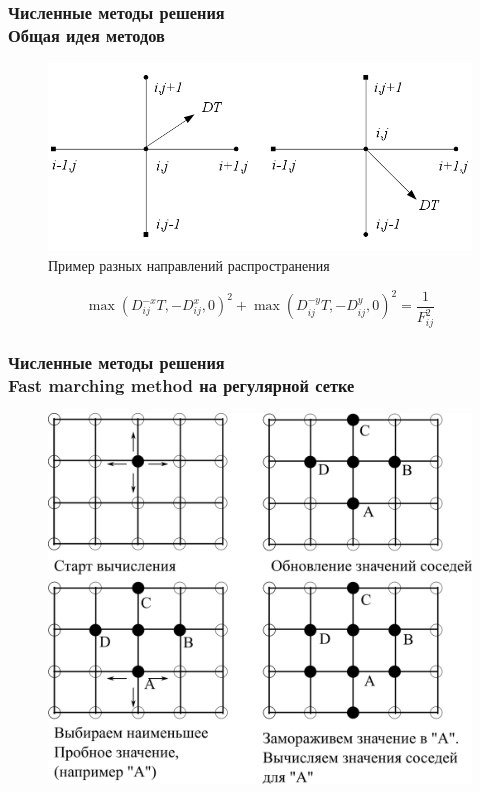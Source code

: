 \documentclass[hyperref={unicode=true},professionalfont]{beamer}
\newcommand{\stamp}{
	\begin{frame}[plain,noframenumbering]
		\begin{table}[h!]
			\flushright
			\vspace{5cm}
			\begin{adjustbox}{max width=0.7\textwidth}
				\begin{tabular}{
					|>{\footnotesize}p{0.8cm}|
					>{\footnotesize}p{0.8cm}|
					>{\footnotesize}p{2.2cm}|
					>{\footnotesize}p{1.1cm}|
					>{\footnotesize}p{0.8cm}|
					>{\footnotesize}p{5cm}|
					>{\footnotesize}p{0.1cm}|
					>{\footnotesize}p{0.1cm}|
					>{\footnotesize}p{0.1cm}|
					>{\footnotesize}p{0.8cm}|
					>{\footnotesize}p{1.4cm}|
				}
					\hline
					&&&&& \multicolumn{6}{>{\footnotesize}c|}{\multirow{3}{*}{\Large 0.043.00.00 ПЗ}} \\ \cline{1-5}
					&&&&& \multicolumn{6}{>{\footnotesize}c|}{} \\ \cline{1-5}
					Изм. & Лист & № Документа & Подпись & Дата & \multicolumn{6}{>{\footnotesize}c|}{} \\ \hline
					\multicolumn{2}{|>{\footnotesize}l|}{Разработал}
                    & Апанович Д.В. &  &  &
                                            \multirow{4}{5cm}{\centering
                                            Параллельный алгоритм
                                            численного решения
                                            анизотропного уравнения эйконала} & \multicolumn{3}{>{\footnotesize}l|}{Лит.} & Лист & Листов \\ \cline{1-5}\cline{7-11}
					\multicolumn{2}{|>{\footnotesize}l|}{Проверил}
                    & Казаков А.Л. &  &  &  & У & & & \insertframenumber & \inserttotalframenumber \\ \cline{1-5}\cline{7-11}
					\multicolumn{2}{|>{\footnotesize}l|}{Нормоконтролер}
                    & Казаков А.Л. &  &  &  & \multicolumn{5}{>{\footnotesize}l|}{} \\ \cline{1-5}
					\multicolumn{2}{|>{\footnotesize}l|}{} &  &  &  &  & \multicolumn{5}{>{\footnotesize}l|}{Кафедра АС, гр. ИСТм-16-1} \\ \cline{1-5}
					\multicolumn{2}{|>{\footnotesize}l|}{Утвердил}
                    & Бахвалов С.В. &  &  &  & \multicolumn{5}{>{\footnotesize}l|}{} \\ \hline

				\end{tabular}
			\end{adjustbox}
		\end{table}

	\end{frame}
}
\renewcommand{\stamp}{}
\begin{document}
\begin{frame}
  \frametitle{Численные методы решения\\Общая идея методов}

\begin{figure}[H]
  \centering
  \includegraphics[width=0.8\linewidth]{upwind-schema.png}
  \hfil \caption{Пример разных направлений распространения}
  \label{fig:upwind-schema}

\end{figure}

  \begin{equation}
  \label{eq:godunov-schema}
       \max (D^{-x}_{ij}T, -D^{x}_{ij},0)^2 + \max (D^{-y}_{ij}T, -D^{y}_{ij},0)^2
  = \frac{1}{F_{ij}^2}
\end{equation}
\end{frame}
\stamp

\begin{frame}
\frametitle{Численные методы решения \\ Fast marching method на
    регулярной сетке}
\begin{figure}[ht]
  \centering
  \includegraphics[width=0.7\linewidth]{fmm_expand.png}
  \label{fig:eikvis}

\end{figure}
\end{frame}
\stamp
\end{document}

